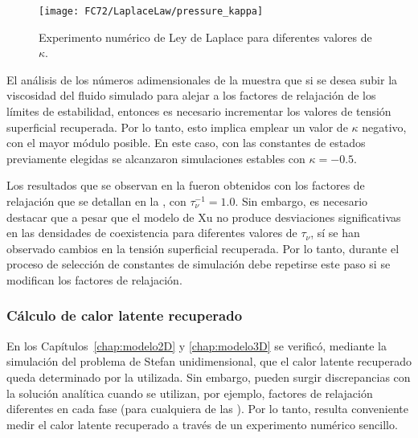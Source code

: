 \begin{figure}[ht]
	\centering
	\texttt{[image: FC72/LaplaceLaw/pressure\_kappa]}
	\caption{Experimento num\'erico de Ley de Laplace para diferentes valores de $\kappa$.}
	\label{fig:delta_p_kappa}
\end{figure}

El an\'alisis de los n\'umeros adimensionales de la  muestra que si se desea subir la viscosidad del fluido simulado para alejar a los factores de relajaci\'on de los l\'imites de estabilidad, entonces es necesario incrementar los valores de tensi\'on superficial recuperada. Por lo tanto, esto implica emplear un valor de $\kappa$ negativo, con el mayor m\'odulo posible. En este caso, con las constantes de estados previamente elegidas se alcanzaron simulaciones estables con $\kappa=-0.5$.

Los resultados que se observan en la  fueron obtenidos con los factores de relajaci\'on que se detallan en la , con $\tau_{\nu}^{-1}=1.0$. Sin embargo, es necesario destacar que a pesar que el modelo de Xu no produce desviaciones significativas en las densidades de coexistencia para diferentes valores de $\tau_{\nu}$, s\'i se han observado cambios en la tensi\'on superficial recuperada. Por lo tanto, durante el proceso de selecci\'on de constantes de simulaci\'on debe repetirse este paso si se modifican los factores de relajaci\'on.


\subsubsection{C\'alculo de calor latente recuperado}

En los Cap\'itulos~\ref{chap:modelo2D} y \ref{chap:modelo3D} se verific\'o, mediante la simulaci\'on del problema de Stefan unidimensional, que el calor latente recuperado queda determinado por la \eos{} utilizada. Sin embargo, pueden surgir discrepancias con la soluci\'on anal\'itica cuando se utilizan, por ejemplo, factores de relajaci\'on  diferentes en cada fase (para cualquiera de las \lbe{}). Por lo tanto, resulta conveniente medir el calor latente recuperado a trav\'es de un experimento num\'erico sencillo.

